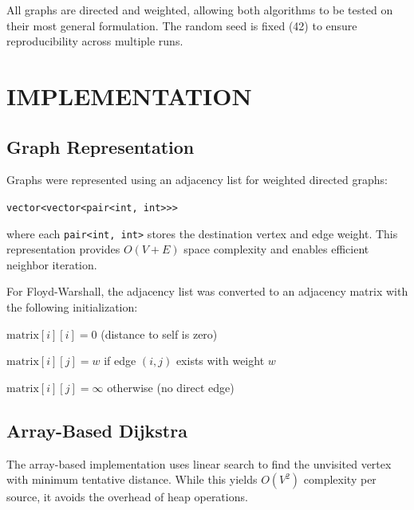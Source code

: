 \documentclass[12pt, a4paper]{report}
\begin{document}
All graphs are directed and weighted, allowing both algorithms to be tested on their most general formulation. The random seed is fixed (42) to ensure reproducibility across multiple runs.

\chapter{IMPLEMENTATION}

\section{Graph Representation}

Graphs were represented using an adjacency list for weighted directed graphs: 

\texttt{vector<vector<pair<int, int>{>}>} 

where each \texttt{pair<int, int>} stores the destination vertex and edge weight. This representation provides $O(V + E)$ space complexity and enables efficient neighbor iteration.

For Floyd-Warshall, the adjacency list was converted to an adjacency matrix with the following initialization:
\begin{dashenum}
  \item $\text{matrix}[i][i] = 0$ (distance to self is zero)
  \item $\text{matrix}[i][j] = w$ if edge $(i, j)$ exists with weight $w$
  \item $\text{matrix}[i][j] = \infty$ otherwise (no direct edge)
\end{dashenum}

\section{Array-Based Dijkstra}

The array-based implementation uses linear search to find the unvisited vertex with minimum tentative distance. While this yields $O(V^2)$ complexity per source, it avoids the overhead of heap operations.
\end{document}
